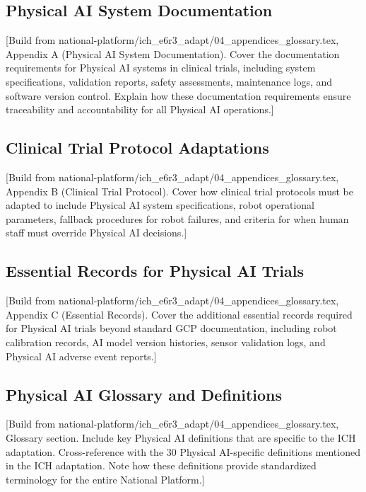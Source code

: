 \subsection{Physical AI System Documentation}
\label{subsec:ich-documentation}

[Build from national-platform/ich\_e6r3\_adapt/04\_appendices\_glossary.tex,
Appendix A (Physical AI System Documentation). Cover the documentation
requirements for Physical AI systems in clinical trials, including system
specifications, validation reports, safety assessments, maintenance logs, and
software version control. Explain how these documentation requirements
ensure traceability and accountability for all Physical AI operations.]

\subsection{Clinical Trial Protocol Adaptations}
\label{subsec:ich-protocol}

[Build from national-platform/ich\_e6r3\_adapt/04\_appendices\_glossary.tex,
Appendix B (Clinical Trial Protocol). Cover how clinical trial protocols
must be adapted to include Physical AI system specifications, robot
operational parameters, fallback procedures for robot failures, and
criteria for when human staff must override Physical AI decisions.]

\subsection{Essential Records for Physical AI Trials}
\label{subsec:ich-records}

[Build from national-platform/ich\_e6r3\_adapt/04\_appendices\_glossary.tex,
Appendix C (Essential Records). Cover the additional essential records
required for Physical AI trials beyond standard GCP documentation,
including robot calibration records, AI model version histories, sensor
validation logs, and Physical AI adverse event reports.]

\subsection{Physical AI Glossary and Definitions}
\label{subsec:ich-glossary}

[Build from national-platform/ich\_e6r3\_adapt/04\_appendices\_glossary.tex,
Glossary section. Include key Physical AI definitions that are specific to
the ICH adaptation. Cross-reference with the 30 Physical AI-specific
definitions mentioned in the ICH adaptation. Note how these definitions
provide standardized terminology for the entire National Platform.]
